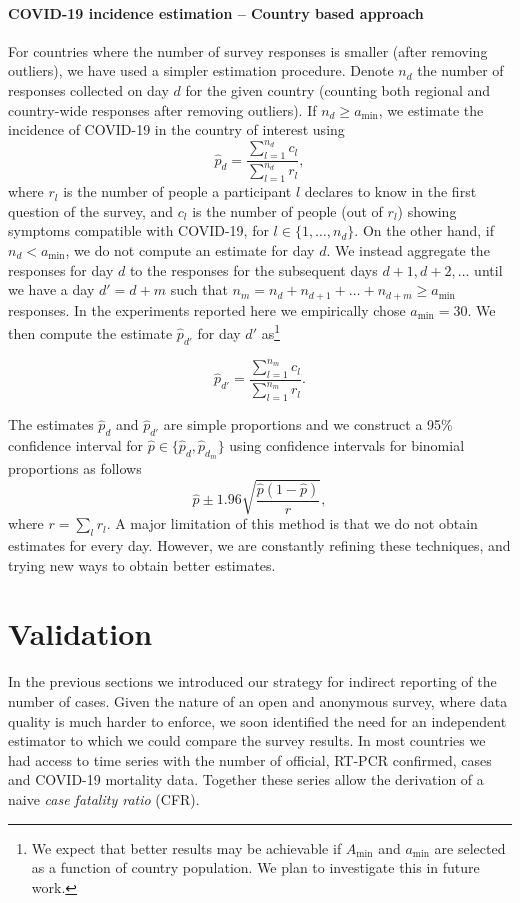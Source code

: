 \documentclass{article}
\begin{document}
\paragraph{COVID-19 incidence estimation -- Country based approach}
For countries where the number of survey responses is smaller (after removing outliers), we have used a simpler estimation procedure. Denote $n_d$ the number of responses collected on day $d$ for the given country (counting both regional and country-wide responses after removing outliers). If $n_d \geq a_{\min}$, we estimate the incidence of COVID-19 in the country of interest using
$$
\hat{p}_d = \frac{\sum_{l = 1}^{n_d} c_l}{\sum_{l = 1}^{n_d} r_l},
$$
where $r_l$ is the number of people a participant $l$ declares to know in the first question of the survey, and $c_l$ is the number of people (out of $r_l$) showing symptoms compatible with COVID-19, for $l \in \{1,\ldots, n_d\}$. On the other hand, if $n_d < a_{\min}$, we do not compute an estimate for day $d$. We instead aggregate the responses for day $d$ to the responses for the subsequent days $d+1, d+2, \ldots$ until we have a day $d'=d+m$ such that $n_m = n_d + n_{d+1} + \ldots + n_{d+m} \geq a_{\min}$ responses. In the experiments reported here we empirically chose $a_{\min}=30$.  We then compute the estimate $\hat{p}_{d'}$ for day $d'$ as\footnote{We expect that better results may be achievable if $A_{\min}$ and $a_{\min}$ are selected as a function of country population. We plan to investigate this in future work.}

$$\hat{p}_{d'} = \frac{\sum_{l = 1}^{n_m} c_l}{\sum_{l = 1}^{n_m} r_l}.$$

The estimates $\hat{p}_d$ and $\hat{p}_{d'}$ are simple proportions and we construct a 95\% confidence interval for $\hat{p} \in \{\hat{p}_d, \hat{p}_{d_m}\}$ using confidence intervals for binomial proportions as follows
$$\hat{p} \pm 1.96\sqrt{\frac{\hat{p}(1-\hat{p})}{r}},$$
where $r = \sum_{l} r_l$. A major limitation of this method is that we do not obtain estimates for every day. However, we are constantly refining these techniques, and trying new ways to obtain better estimates. 

\section{Validation}

In the previous sections we introduced our strategy for indirect reporting of the number of cases. Given the nature of an open and anonymous survey, where data quality is much harder to enforce, we soon identified the need for an independent estimator to which we could compare the survey results. In most countries we had access to time series with the number of official, RT-PCR confirmed, cases and COVID-19 mortality data. Together these series allow the derivation of a naive \emph{case fatality ratio} (CFR). 
\end{document}
